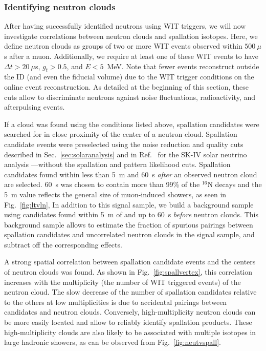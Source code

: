 \subsubsection{Identifying neutron clouds}
\label{sec:hadronic_spall}
After having successfully identified neutrons using WIT triggers, we will now investigate correlations between neutron clouds and spallation isotopes. Here, we define neutron clouds as groups of two or more WIT events observed within $500~\mu$s after a muon. Additionally, we require at least one of these WIT events to have $\Delta t > 20~\mu$s, $g_t > 0.5$, and $E < 5$~MeV. Note that fewer events reconstruct outside the ID (and even the fiducial volume) due to the WIT trigger conditions on the online event reconstruction.
As detailed at the beginning of this section, these cuts allow to discriminate neutrons against noise fluctuations, radioactivity, and afterpulsing events.

If a cloud was found using the conditions listed above, spallation candidates were searched for in close proximity of the center of a neutron cloud. Spallation candidate events were preselected using the noise reduction and quality cuts described in Sec.~\ref{sec:solaranalysis} and in Ref.~\cite{skivsolar} for the SK-IV solar neutrino analysis ---without the spallation and pattern likelihood cuts. Spallation candidates found within less than 5~m and 60~s \emph{after} an observed neutron cloud are selected. 
60~s was chosen to contain more than 99\% of the $^{16}$N decays and the 5~m value reflects the general size of muon-induced showers, as seen in Fig.~\ref{fig:ltvln}, %
In addition to this signal sample, we build a background sample using candidates found within 5~m of and up to 60~s \emph{before} neutron clouds. This background sample allows to estimate the fraction of spurious pairings between spallation candidates and uncorrelated neutron clouds in the signal sample, and subtract off the corresponding effects.

A strong spatial correlation between spallation candidate events and the centers of neutron clouds was found. As shown in Fig.~\ref{fig:spallvertex}, this correlation increases with the multiplicity (the number of WIT triggered events) of the neutron cloud. The slow decrease of the number of spallation candidates relative to the others at low multiplicities is due to accidental pairings between candidates and neutron clouds. Conversely, high-multiplicity neutron clouds can be more easily located and allow to reliably identify spallation products. These high-multiplicity clouds are also likely to be associated with multiple isotopes in large hadronic showers, as can be observed from Fig.~\ref{fig:neutvspall}. 

